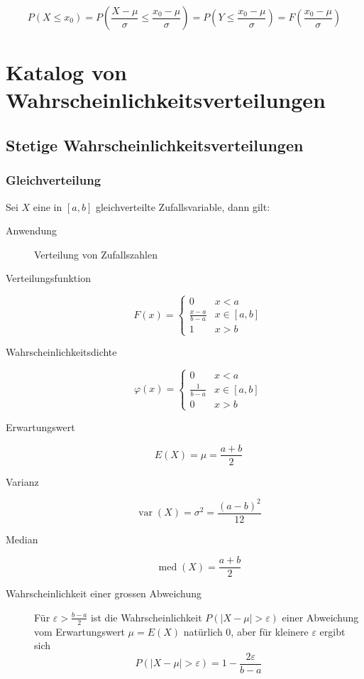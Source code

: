 \[ P(X \leq x_0) = P\left(\frac{X-\mu}{\sigma} \leq \frac{x_0 -
\mu}{\sigma}\right) = P\left(Y \leq \frac{x_0 - \mu}{\sigma}\right) =
F\left(\frac{x_0 - \mu}{\sigma}\right) \]

\section{Katalog von Wahrscheinlichkeitsverteilungen}
\subsection{Stetige Wahrscheinlichkeitsverteilungen}
\subsubsection{Gleichverteilung}
Sei $X$ eine in $[a,b]$ gleichverteilte Zufallsvariable, dann gilt:
\begin{description}
  \item[Anwendung] Verteilung von Zufallszahlen
  \item[Verteilungsfunktion] \[F(x) = \begin{cases} 0 & x < a \\
    \frac{x-a}{b-a} & x \in [a,b] \\ 1 & x > b\end{cases}\]
  \item[Wahrscheinlichkeitsdichte] \[\varphi(x) = \begin{cases} 0 & x < a \\
    \frac{1}{b-a} & x \in [a,b] \\ 0 & x > b\end{cases}\]
  \item[Erwartungswert] \[E(X) = \mu = \frac{a+b}{2}\]
  \item[Varianz] \[\operatorname{var}(X) = \sigma^2 = \frac{(a-b)^2}{12}\]
  \item[Median] \[\operatorname{med}(X) = \frac{a+b}{2}\]
  \item[Wahrscheinlichkeit einer grossen Abweichung] Für $\varepsilon >
  \frac{b-a}{2}$ ist die Wahrscheinlichkeit $P(|X-\mu| > \varepsilon)$
    einer Abweichung vom Erwartungswert $\mu = E(X)$ natürlich 0, aber für
    kleinere $\varepsilon$ ergibt sich
    \[P(|X-\mu| > \varepsilon) = 1 - \frac{2\varepsilon}{b-a}\]
\end{description}

